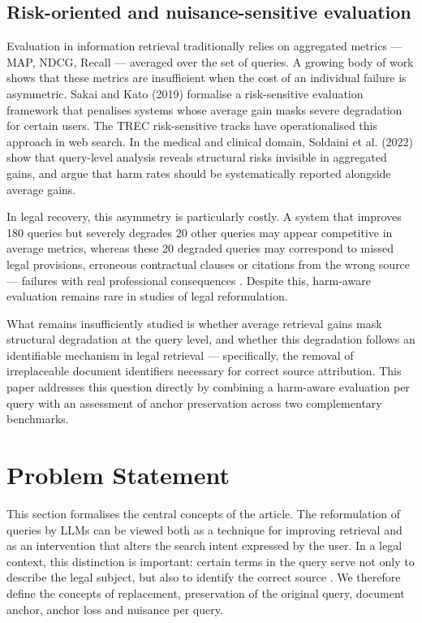 \documentclass[a4paper,fleqn]{cas-dc}
\begin{document}
\subsection{Risk-oriented and nuisance-sensitive evaluation}

Evaluation in information retrieval traditionally relies
on aggregated metrics — MAP, NDCG, Recall — averaged over
the set of queries. A growing body of work shows that these
metrics are insufficient when the cost of an individual failure is
asymmetric. Sakai and Kato (2019) formalise a 
risk-sensitive evaluation framework that penalises systems whose average gain masks
severe degradation for certain users. The TREC
risk-sensitive tracks have operationalised this approach in web search.
In the medical and clinical domain, Soldaini et al. (2022) show
that query-level analysis reveals structural risks invisible
in aggregated gains, and argue that harm rates should be
systematically reported alongside average gains.

In legal recovery, this asymmetry is particularly
costly. A system that improves 180 queries but severely degrades
20 other queries may appear competitive in average metrics, whereas these
20 degraded queries may correspond to missed legal provisions,
erroneous contractual clauses or citations
from the wrong source — failures with real professional consequences
. Despite this, harm-aware evaluation remains rare in
studies of legal reformulation.

What remains insufficiently studied is whether average
retrieval gains mask structural degradation at the
query level, and whether this degradation follows an identifiable mechanism in
legal retrieval --- specifically, the removal
of irreplaceable document identifiers necessary for
correct source attribution. This paper addresses this question directly
by combining a harm-aware evaluation per query with an assessment of
anchor preservation across two complementary benchmarks.

\section{Problem Statement}
 
This section formalises the central concepts of the article. The reformulation of
queries by LLMs can be viewed both as a technique for improving
retrieval and as an intervention that alters the search intent
expressed by the user. In a legal context, this
distinction is important: certain terms in the query serve not
only to describe the legal subject, but also to identify the correct source
. We therefore define the concepts of replacement, preservation of
the original query, document anchor, anchor loss and nuisance per
query.
 
\end{document}
